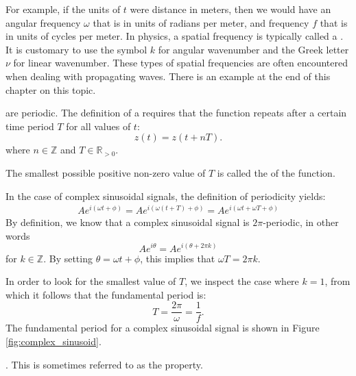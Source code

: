 For example, if the units of $t$ were distance in meters, then we would have an angular frequency $\omega$ that is in units of radians per meter, and frequency $f$ that is in units of cycles per meter. In physics, a spatial frequency is typically called a \emph{}. It is customary to use the symbol $k$ for angular wavenumber and the Greek letter $\nu$ for linear wavenumber. These types of spatial frequencies are often encountered when dealing with propagating waves. There is an example at the end of this chapter on this topic.

 are periodic. The definition of a  requires that the function repeats after a certain time period $T$ for all values of $t$:
\begin{equation}
\boxed{z(t) = z(t+ n T).}
\end{equation}
where $n \in \mathbb{Z}$ and $T \in \mathbb{R}_{>0}$.  

The smallest possible positive non-zero value of $T$ is called the \emph{} of the function. 

In the case of complex sinusoidal signals, the definition of periodicity yields:
\begin{align}
Ae^{i (\omega t + \phi)}= Ae^{i (\omega (t+T) + \phi)} = Ae^{i (\omega t+ \omega T + \phi)}
\end{align}
By definition, we know that a complex sinusoidal signal is
$2\pi$-periodic, in other words
\begin{equation}
Ae^{i\theta}=Ae^{i(\theta+2\pi k)}
\end{equation}
for $k\in\mathbb{Z}$. By setting $\theta = \omega t +\phi$, this implies that $\omega T = 2\pi k$.

In order to look for the smallest value of $T$, we inspect the case where $k=1$, from which it follows that the fundamental period is:
\begin{equation}
\boxed{T = \frac{2\pi}{\omega} = \frac{1}{f}.}
\end{equation}
The fundamental period for a complex sinusoidal signal is shown in Figure \ref{fig:complex_sinusoid}.

. This is sometimes referred to as the \emph{} property.

